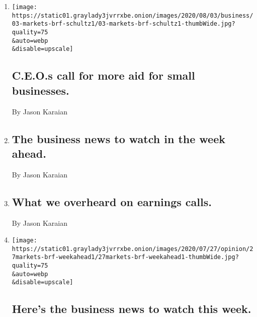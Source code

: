 \begin{enumerate}
\def\labelenumi{\arabic{enumi}.}
\item
  \href{/2020/08/03/business/ceos-call-for-more-aid-for-small-businesses.html}{}

  \texttt{[image: https://static01.graylady3jvrrxbe.onion/images/2020/08/03/business/03-markets-brf-schultz1/03-markets-brf-schultz1-thumbWide.jpg?quality=75\\\&auto=webp\\\&disable=upscale]}

  \hypertarget{ceos-call-for-more-aid-for-small-businesses}{%
  \subsection{C.E.O.s call for more aid for small
  businesses.}\label{ceos-call-for-more-aid-for-small-businesses}}

  By Jason Karaian
\item
  \href{/2020/08/03/business/the-business-news-to-watch-in-the-week-ahead.html}{}

  \hypertarget{the-business-news-to-watch-in-the-week-ahead}{%
  \subsection{The business news to watch in the week
  ahead.}\label{the-business-news-to-watch-in-the-week-ahead}}

  By Jason Karaian
\item
  \href{/live/2020/07/31/business/stock-market-today-coronavirus/what-we-overheard-on-earnings-calls}{}

  \hypertarget{what-we-overheard-on-earnings-calls}{%
  \subsection{What we overheard on earnings
  calls.}\label{what-we-overheard-on-earnings-calls}}

  By Jason Karaian
\item
  \href{/2020/07/27/business/heres-the-business-news-to-watch-this-week.html}{}

  \texttt{[image: https://static01.graylady3jvrrxbe.onion/images/2020/07/27/opinion/27markets-brf-weekahead1/27markets-brf-weekahead1-thumbWide.jpg?quality=75\\\&auto=webp\\\&disable=upscale]}

  \hypertarget{heres-the-business-news-to-watch-this-week}{%
  \subsection{Here's the business news to watch this
  week.}\label{heres-the-business-news-to-watch-this-week}}


\end{enumerate}
